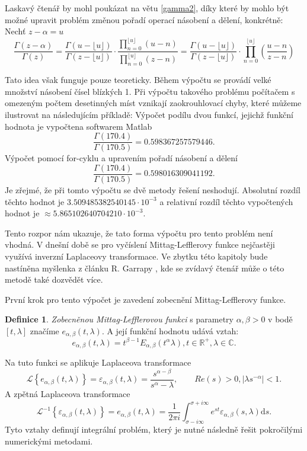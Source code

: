 \documentclass[a4paper,12pt,twoside]{article}
\theoremstyle{definition}
\newtheorem{defin}[veta]{Definice}
\theoremstyle{remark}
\numberwithin{equation}{section}
\numberwithin{table}{section}
\numberwithin{figure}{section}
\newcommand{\dx}[1]{\mathrm{d} #1}
\newcommand{\R}{\mathbb{R}}
\newcommand{\C}{\mathbb{C}}
\begin{document}
Laskavý čtenář by mohl poukázat na větu \ref{gamma2}, díky které by mohlo být možné upravit problém změnou pořadí operací násobení a dělení, konkrétně:
Nechť $z-\alpha = u$
$$\frac{\Gamma\left(z - \alpha\right)}{\Gamma\left(z\right)} = 
\frac{\Gamma\left(u-\lfloor u\rfloor \right)}{\Gamma \left(z - \lfloor u\rfloor \right)} \cdot \frac{\prod_{n=0}^{\lfloor u \rfloor } \left(u-n\right)}{\prod_{n=0}^{\lfloor u\rfloor} \left(z-n\right)}  = 
\frac{\Gamma\left(u-\lfloor u\rfloor \right)}{\Gamma \left(z - \lfloor u\rfloor \right)} \cdot \prod_{n=0}^{\lfloor u \rfloor} \left(\frac{u-n}{z-n}\right)  $$

Tato idea však funguje pouze teoreticky. Během výpočtu se provádí velké množství násobení čísel blízkých 1. Při výpočtu takového problému počítačem s omezeným počtem desetinných míst vznikají zaokrouhlovací chyby, které můžeme ilustrovat na následujícím příkladě:
Výpočet podílu dvou funkcí, jejichž funkční hodnota je vypočtena softwarem Matlab
$$\frac{\Gamma\left(170.4\right)}{\Gamma\left(170.5\right)} = 0.598367257579446.$$
Výpočet pomocí for-cyklu a upravením pořadí násobení a dělení
 $$ \frac{\Gamma\left(170.4\right)}{\Gamma\left(170.5\right)} = 0.598016309041192.$$
 Je zřejmé, že při tomto výpočtu se dvě metody řešení neshodují. Absolutní rozdíl těchto hodnot je $3.509485382540145 \cdot 10^{-3} $ a relativní rozdíl těchto vypočtených hodnot je $\approx 5.865102640704210\cdot 10^{-3}$. 
 
 Tento rozpor nám ukazuje, že tato forma výpočtu pro tento problém není vhodná. V dnešní době se pro vyčíslení Mittag-Lefflerovy funkce nejčastěji využívá inverzní Laplaceovy transformace. Ve zbytku této kapitoly bude nastíněna myšlenka z článku R. Garrapy \cite{Garrappa}, kde se zvídavý čtenář může o této metodě také dozvědět více.

První krok pro tento výpočet je zavedení zobecnění Mittag-Lefflerovy funkce.
\begin{defin}
	\emph{Zobecněnou Mittag-Lefflerovou funkci} s parametry $\alpha, \beta > 0$ v bodě $\left[t,\lambda \right]$ značíme $e_{\alpha, \beta}\left(t,\lambda\right)$. A její funkční hodnotu udává vztah:
	$$e_{\alpha, \beta}\left(t,\lambda\right) = t^{\beta - 1} E_{\alpha,\beta} \left(t^{\alpha}\lambda\right), t \in \R^{+}, \lambda \in \C.$$
\end{defin}
Na tuto funkci se aplikuje Laplaceova transformace
\begin{equation}
	 \mathcal{L}\left\lbrace e_{\alpha, \beta}\left(t,\lambda\right) \right\rbrace = \varepsilon_{\alpha, \beta} \left(t,\lambda \right)  = \frac{s^{\alpha-\beta}}{s^{\alpha} - \lambda}, \qquad Re(s) > 0, |\lambda s^{-\alpha}|<1.
\end{equation}
A zpětná Laplaceova transformace
\begin{equation}
	\mathcal{L}^{-1} \left\lbrace \varepsilon_{\alpha, \beta} \left(t,\lambda \right) \right\rbrace  = e_{\alpha, \beta}\left(t,\lambda\right) = \frac{1}{2\pi i} \int_{\sigma-i \infty}^{\sigma+i \infty} e^{st}\varepsilon_{\alpha, \beta}\left(s,\lambda\right)\dx s.
\end{equation}
Tyto vztahy definují integrální problém, který je nutné následně řešit pokročilými numerickými metodami.
\end{document}
